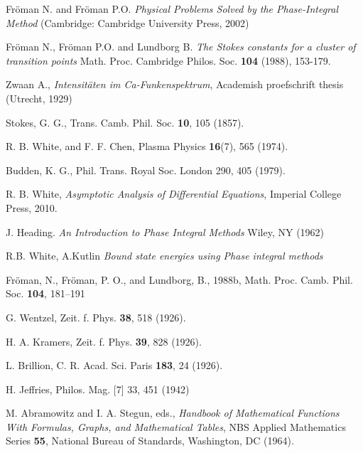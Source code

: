 \documentclass[aip,jmp,reprint]{revtex4-1}
\begin{document}
\begin{thebibliography}{30}

 Fr\"oman N. and Fr\"oman P.O. \textit{Physical Problems Solved by the Phase-Integral Method} (Cambridge: Cambridge University Press, 2002)

 Fr\"oman N., Fr\"oman P.O. and Lundborg B. \textit{The Stokes constants for a cluster of transition
points} Math. Proc. Cambridge Philos. Soc. \textbf{104} (1988), 153-179.

 Zwaan A., \textit{Intensit\"aten im Ca-Funkenspektrum}, Academish proefschrift thesis (Utrecht, 1929)

 Stokes, G. G., Trans. Camb. Phil. Soc. \textbf{10}, 105 (1857).

 R. B. White, and F. F. Chen, {Plasma Physics} \textbf{16}(7), 565 (1974).

 Budden, K. G., Phil. Trans. Royal Soc. London 290, 405 (1979).

 R. B. White,
 {\it Asymptotic Analysis of Differential Equations}, Imperial College Press, 2010.

 J. Heading. {\it An Introduction to Phase Integral Methods} 
Wiley, NY (1962)

 R.B. White, A.Kutlin {\it Bound state energies using Phase integral methods} 

%

 Fr\"oman, N., Fr\"oman, P. O., and Lundborg, B., 1988b, 
Math. Proc. Camb. Phil. Soc. \textbf{104}, 181–191

 G. Wentzel, Zeit. f. Phys. \textbf{38}, 518 (1926).

 H. A. Kramers, Zeit. f. Phys. \textbf{39}, 828 (1926).

 L. Brillion, C. R. Acad. Sci. Paris \textbf{183}, 24 (1926).

 H. Jeffries, Philos. Mag. [7] 33, 451 (1942)

 M. Abramowitz and I. A. Stegun, eds., 
{\it Handbook of Mathematical Functions With Formulas, Graphs, and Mathematical Tables}, 
NBS Applied Mathematics Series \textbf{55}, National Bureau of Standards, Washington, DC (1964).

\end{thebibliography}
\end{document}
